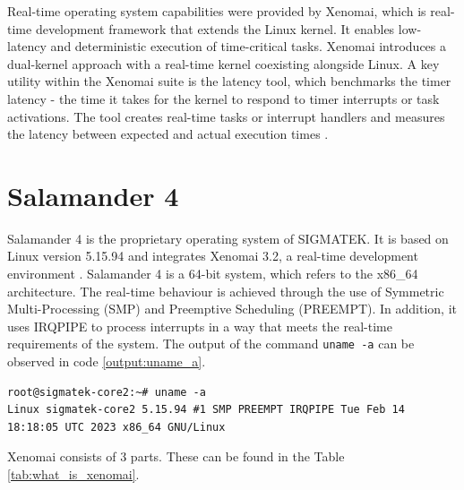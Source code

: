 \documentclass[MMR,Master,english]{twbook}
\begin{document}
\bigskip \noindent Real-time operating system capabilities were provided by Xenomai, which is real-time development framework that extends the Linux kernel. It enables low-latency and deterministic execution of time-critical tasks. Xenomai introduces a dual-kernel approach with a real-time kernel coexisting alongside Linux. A key utility within the Xenomai suite is the latency tool, which benchmarks the timer latency - the time it takes for the kernel to respond to timer interrupts or task activations. The tool creates real-time tasks or interrupt handlers and measures the latency between expected and actual execution times \cite{XenomaiXenomai}.


\clearpage

\chapter{Salamander 4}\label{cha:salamander4}

Salamander 4 is the proprietary operating system of SIGMATEK. It is based on Linux version 5.15.94 and integrates Xenomai 3.2, a real-time development environment \cite{XenomaiXenomai}. Salamander 4 is a 64-bit system, which refers to the x86\_64 architecture. The real-time behaviour is achieved through the use of Symmetric Multi-Processing (SMP) and Preemptive Scheduling (PREEMPT). In addition, it uses IRQPIPE to process interrupts in a way that meets the real-time requirements of the system. The output of the command \texttt{uname -a} can be observed in code \ref{output:uname_a}.

\vspace{1em}
\begin{minipage}{0.95\columnwidth}
	\begin{lstlisting}[name={System information},label={output:uname_a}]
root@sigmatek-core2:~# uname -a
Linux sigmatek-core2 5.15.94 #1 SMP PREEMPT IRQPIPE Tue Feb 14 18:18:05 UTC 2023 x86_64 GNU/Linux
\end{lstlisting}
\end{minipage}



Xenomai consists of 3 parts. These can be found in the Table \ref{tab:what_is_xenomai}.
\end{document}
